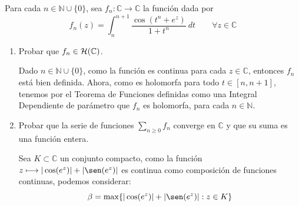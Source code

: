 \documentclass[12pt]{article}
\begin{document}
    \newpage
    \setcounter{ejercicio}{0}
    \begin{ejercicio}[2.5 puntos]
        Para cada $n\in \mathbb{N}\cup \{0\}$, sea $f_n:\mathbb{C}\to\mathbb{C}$ la función dada por
        \begin{equation*}
            f_n(z) = \int_{n}^{n+1} \dfrac{\cos(t^n+e^z)}{1+t^n}~dt  \qquad \forall z\in \mathbb{C}
        \end{equation*}
        \begin{enumerate}[label=\alph*)]
            \item Probar que $f_n\in \mathcal{H}(\mathbb{C})$.

                Dado $n\in \mathbb{N}\cup \{0\}$, como la función 
                es continua para cada $z\in \mathbb{C}$, entonces $f_n$ está bien definida. Ahora, como
                es holomorfa para todo $t\in [n,n+1]$, tenemos por el Teorema de Funciones definidas como una Integral Dependiente de parámetro que $f_n$ es holomorfa, para cada $n\in \mathbb{N}$.
            \item Probar que la serie de funciones $\sum\limits_{n\geq 0} f_n$ converge en $\mathbb{C}$ y que su suma es una función entera.

                Sea $K\subset \mathbb{C}$ un conjunto compacto, como la función $z\longmapsto |\cos(e^z)|+|\sen(e^z)|$ es continua como composición de funciones continuas, podemos considerar:
                \begin{equation*}
                    \beta = \max\{|\cos(e^z)|+|\sen(e^z)| : z\in K\}
                \end{equation*}


\end{enumerate}
\end{ejercicio}
\end{document}
